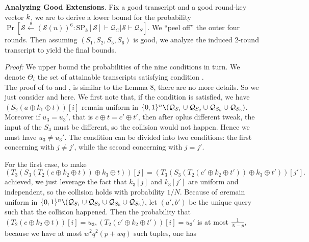 
\arrangespace

\noindent \textbf{Analyzing Good Extensions}.
%
Fix a good transcript and a good round-key vector $\mathnormal{k}$, we are to derive a lower bound for the probability  $\operatorname{Pr}\left[\mathcal{S} \stackrel{\mathbf{s}}{\leftarrow}(\mathcal{S}(n))^{6}: \mathrm{SP}_{k}[\mathcal{S}] \vdash \mathcal{Q}_{C} | \mathcal{S} \vdash \mathcal{Q}_{S}\right]$. We ``peel off'' the outer four rounds. Then assuming $(S_{1}, S_2, S_{5}, S_6)$ is good, we analyze the induced 2-round transcript to yield the final bounds.






\noindent \emph{Proof:} We upper bound the probabilities of the nine conditions in turn. We denote $\Theta_i$ the set of attainable transcripts satisfying condition \hi.\\

The proof of \hone to \hfive and \hseven , \height is similar to the Lemma 8, there are no more details. So we just consider \hsix and \hnine here. We first note that, if the condition is satisfied, we have $\left(S_{2}\left(a \oplus k_{1} \oplus t\right)\right)[i]$ remain uniform in $\{0, 1\}^{n} \verb|\| (\mathcal{Q}_{S_{1}} \cup \mathcal{Q}_{S_{2}} \cup \mathcal{Q}_{S_{5}} \cup \mathcal{Q}_{S_{6}})$.  Moreover if $u_3 =u_3'$, that is $c \oplus t=c' \oplus t'$, then after oplus different tweak, the input of the $S_4$ must be different, so the collision would not happen. Hence we must have $u_3 \neq u_3'$. The condition can be divided into two conditions: the first concerning with $j\neq j'$, while the second concerning with $j=j'$.

For the first case, to make 
$$
  \left(T_{3}\left(S_{3}\left(T_2\left(c \oplus k_{2} \oplus t\right)\right) \oplus k_{3} \oplus t\right)\right)[j] = \left(T_{3}\left(S_{3}\left(T_2\left(c' \oplus k_{2} \oplus t'\right)\right) \oplus k_{3} \oplus t'\right)\right)[j'].
$$
\noindent achieved, we just leverage the fact that $k_3[j]$ and $k_3[j']$ are uniform and independent, so the collision holds with probability $1/N$. Because of $a$remain uniform in $\{0, 1\}^{n} \verb|\| (\mathcal{Q}_{S_{1}} \cup \mathcal{Q}_{S_{2}} \cup \mathcal{Q}_{S_{5}} \cup\mathcal{Q}_{S_{6}})$, let $(a', b')$ be the unique query such that the collision happened. Then the probability that $\left(T_2\left(c \oplus k_{2} \oplus t\right)\right)[i] = u_3, \left(T_2\left(c' \oplus k_{2} \oplus t'\right)\right)[i] = u_3'$ is at most $\frac{1}{N-p}$, because we have at most $w^2 q^2(p+ w q)$ such tuples, one has

